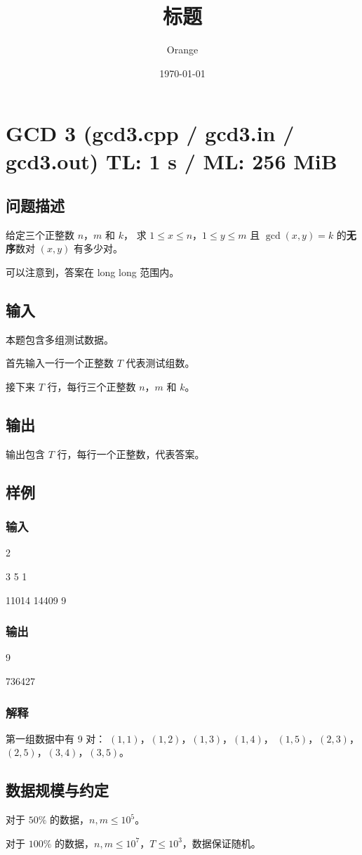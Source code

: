 \documentclass[UTF8]{article}
\title{标题}
\author{Orange}
\date{\today}
\begin{document}
	\heiti

	\section{GCD 3 \small(gcd3.cpp / gcd3.in / gcd3.out) TL: 1 s / ML: 256 MiB}
	\subsection{问题描述}
	给定三个正整数 $n$，$m$ 和 $k$，
	求 $1 \le x \le n$，$1 \le y \le m$ 且 $\gcd(x, y) = k$ 的\textbf{无序}数对 $(x, y)$ 有多少对。

	可以注意到，答案在 long long 范围内。

	\subsection{输入}
	本题包含多组测试数据。

	首先输入一行一个正整数 $T$ 代表测试组数。

	接下来 $T$ 行，每行三个正整数 $n$，$m$ 和 $k$。

	\subsection{输出}
	输出包含 $T$ 行，每行一个正整数，代表答案。

	\subsection{样例}
	\subsubsection{输入}
	2

	3 5 1

	11014 14409 9

	\subsubsection{输出}
	9

	736427

	\subsubsection{解释}
	第一组数据中有 9 对：
	$(1, 1)$，$(1, 2)$，$(1, 3)$，$(1, 4)$，
	$(1, 5)$，$(2, 3)$，$(2, 5)$，$(3, 4)$，$(3, 5)$。

	\subsection{数据规模与约定}
	对于 $50\%$ 的数据，$n, m \le 10^5$。

	对于 $100\%$ 的数据，$n, m \le 10^7$，$T \le 10^3$，数据保证随机。
\end{document}
